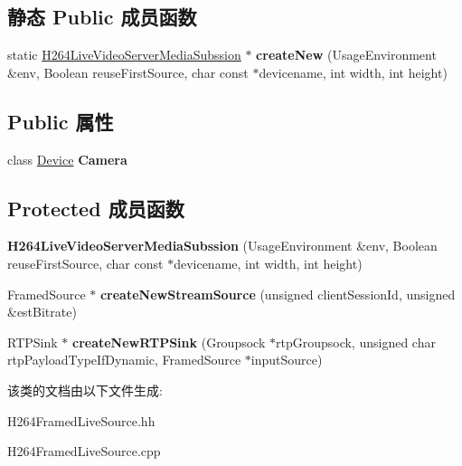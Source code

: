 \subsection*{静态 Public 成员函数}
\begin{DoxyCompactItemize}
\item 
\mbox{\label{class_h264_live_video_server_media_subssion_a50d3d7bf02a7de9f7cf41a0a4f2238af}} 
static \hyperlink{class_h264_live_video_server_media_subssion}{H264\+Live\+Video\+Server\+Media\+Subssion} $\ast$ {\bfseries create\+New} (Usage\+Environment \&env, Boolean reuse\+First\+Source, char const $\ast$devicename, int width, int height)
\end{DoxyCompactItemize}
\subsection*{Public 属性}
\begin{DoxyCompactItemize}
\item 
\mbox{\label{class_h264_live_video_server_media_subssion_ad7052d7e26b215e97e17b53984cdbb67}} 
class \hyperlink{class_device}{Device} {\bfseries Camera}
\end{DoxyCompactItemize}
\subsection*{Protected 成员函数}
\begin{DoxyCompactItemize}
\item 
\mbox{\label{class_h264_live_video_server_media_subssion_abe88b44b0941148e9ee5269dfeb32f1e}} 
{\bfseries H264\+Live\+Video\+Server\+Media\+Subssion} (Usage\+Environment \&env, Boolean reuse\+First\+Source, char const $\ast$devicename, int width, int height)
\item 
\mbox{\label{class_h264_live_video_server_media_subssion_aaca0b83b755639c5d903d05879936085}} 
Framed\+Source $\ast$ {\bfseries create\+New\+Stream\+Source} (unsigned client\+Session\+Id, unsigned \&est\+Bitrate)
\item 
\mbox{\label{class_h264_live_video_server_media_subssion_aa923aa0464fb45f2dba75866d2f22ead}} 
R\+T\+P\+Sink $\ast$ {\bfseries create\+New\+R\+T\+P\+Sink} (Groupsock $\ast$rtp\+Groupsock, unsigned char rtp\+Payload\+Type\+If\+Dynamic, Framed\+Source $\ast$input\+Source)
\end{DoxyCompactItemize}


该类的文档由以下文件生成\+:\begin{DoxyCompactItemize}
\item 
H264\+Framed\+Live\+Source.\+hh\item 
H264\+Framed\+Live\+Source.\+cpp\end{DoxyCompactItemize}

